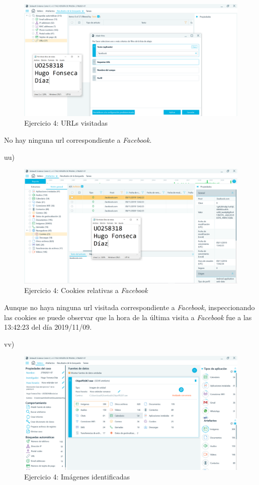 \documentclass[11pt]{article}
\begin{document}
\begin{figure}[H]
    \caption{Ejercicio 4: URLs visitadas}
    \centering
    \includegraphics[scale=0.4]{p04/e7-11.PNG}
\end{figure}

No hay ninguna url correspondiente a \textit{Facebook}.

uu)

\begin{figure}[H]
    \caption{Ejercicio 4: Cookies relativas a \textit{Facebook}}
    \centering
    \includegraphics[scale=0.4]{p04/e7-12.PNG}
\end{figure}

Aunque no haya ninguna url visitada correspondiente a \textit{Facebook}, inspeccionando las cookies se puede observar que la hora de la última visita a \textit{Facebook} fue a las 13:42:23 del día 2019/11/09.

vv)

\begin{figure}[H]
    \caption{Ejercicio 4: Imágenes identificadas}
    \centering
    \includegraphics[scale=0.4]{p04/e7-13.PNG}
\end{figure}
\end{document}
